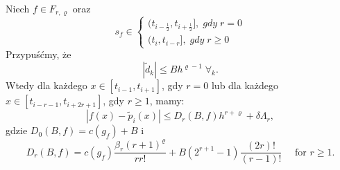 \documentclass[oik, pdftex, robocza, man]{mgrwms}
\begin{document}
    \begin{lemma} \label{lem:algMP_3}
        Niech $f \in F_{r, \varrho}$ oraz 
        \begin{equation*}
            s_{f} \in 
            \left\{
                \begin{array}{ll}
                    (t_{i-\frac{1}{2}}, t_{i + \frac{1}{2}}], \; gdy \; r=0 \\
                    (t_{i}, t_{i - r}], \; gdy \; r \geq 0    
                \end{array}
            \right.
        \end{equation*}
        Przypuśćmy, że 
        \begin{equation} \label{eq:2}
            |\tilde{d}_{k}| \leq Bh^{\varrho-1} \; \forall_{k}.
        \end{equation}
        Wtedy dla każdego $x \in [t_{i-1}, t_{i+1}]$, gdy $r=0$ lub dla każdego $x \in [t_{i-r-1}, t_{i+2r+1}]$, gdy $r \geq 1$, mamy:
        \begin{equation*}
            |f(x) - \tilde{p}_{i}(x)| \leq D_{r}(B, f)h^{r+\varrho} + \delta\Lambda_{r},
        \end{equation*}
        gdzie $D_{0}(B,f) = c(g_{f}) + B$ i
        \begin{equation*}
            D_{r}(B, f)=c\left(g_{f}\right) \frac{\beta_{r}(r+1)^{\varrho}}{r r !}+B\left(2^{r+1}-1\right) \frac{(2 r) !}{(r-1) !} \quad \text { for } r \geq 1 .
        \end{equation*}
    \end{lemma}
\end{document}
